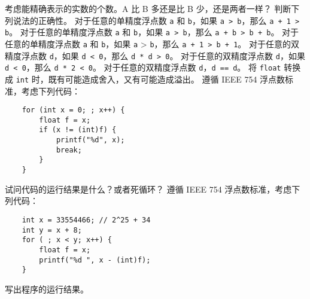 \begin{problems}
			\qn 考虑能精确表示的实数的个数。A 比 B 多还是比 B 少，还是两者一样？
		\pro 判断下列说法的正确性。
			\qn 对于任意的单精度浮点数 \texttt{a} 和 \texttt{b}，如果 \texttt{a > b}，那么 \texttt{a + 1 > b}。
			\qn 对于任意的单精度浮点数 \texttt{a} 和 \texttt{b}，如果 \texttt{a > b}，那么 \texttt{a + b > b + b}。
			\qn 对于任意的单精度浮点数 \texttt{a} 和 \texttt{b}，如果 \texttt{a} > \texttt{b}，那么 \texttt{a + 1 > b + 1}。
			\qn 对于任意的双精度浮点数 \texttt{d}，如果 \texttt{d < 0}，那么 \texttt{d * d > 0}。
			\qn 对于任意的双精度浮点数 \texttt{d}，如果 \texttt{d < 0}，那么 \texttt{d * 2 < 0}。
			\qn 对于任意的双精度浮点数 \texttt{d}，\texttt{d == d}。
			\qn 将 \texttt{float} 转换成 \texttt{int} 时，既有可能造成舍入，又有可能造成溢出。
		\pro 遵循 IEEE 754 浮点数标准，考虑下列代码：
		\begin{verbatim}
    for (int x = 0; ; x++) {
        float f = x;
        if (x != (int)f) {
            printf("%d", x);
            break;
        }
    }
		\end{verbatim}
		试问代码的运行结果是什么？或者死循环？
		\pro 遵循 IEEE 754 浮点数标准，考虑下列代码：
		\begin{verbatim}
    int x = 33554466; // 2^25 + 34
    int y = x + 8;
    for ( ; x < y; x++) {
        float f = x;
        printf("%d ", x - (int)f);
    }
		\end{verbatim}
		写出程序的运行结果。
	\end{problems}